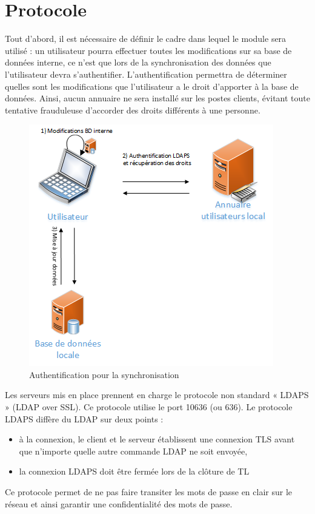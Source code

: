 \documentclass[11pt,fleqn]{report}
\begin{document}
\chapter{Protocole}
Tout d’abord, il est nécessaire de définir le cadre dans lequel le module sera utilisé : un utilisateur pourra effectuer toutes les modifications sur sa base de données interne, ce n’est que lors de la synchronisation des données que l’utilisateur devra s’authentifier.
L’authentification permettra de déterminer quelles sont les modifications que l’utilisateur a le droit d’apporter à la base de données. Ainsi, aucun annuaire ne sera installé sur les postes clients, évitant toute tentative frauduleuse d’accorder des droits différents à une personne.
\begin{figure}[htbp]
	\centering
	\includegraphics[scale=0.9]{Images/SchemaAuthentification.png}
	\caption{Authentification pour la synchronisation}
	\label{SchemaAuthentification}
\end{figure}
Les serveurs mis en place prennent en charge le protocole non standard « LDAPS » (LDAP over SSL). Ce protocole utilise le port 10636 (ou 636). Le protocole LDAPS diffère du LDAP sur deux points :
\begin{itemize}
\item à la connexion, le client et le serveur établissent une connexion TLS avant que n'importe quelle autre commande LDAP ne soit envoyée,
\item la connexion LDAPS doit être fermée lors de la clôture de TL
\end{itemize}
Ce protocole permet de ne pas faire transiter les mots de passe en clair sur le réseau et ainsi garantir une confidentialité des mots de passe.
\end{document}
